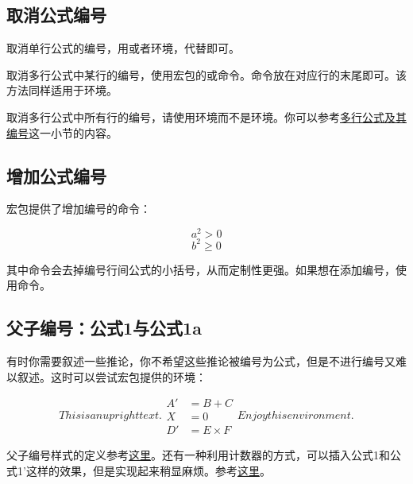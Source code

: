 \subsection{取消公式编号}
取消单行公式的编号，用\latexline{[\char`\\]}或者环境，代替即可。

取消多行公式中某行的编号，使用宏包的或命令。命令放在对应行的末尾即可。该方法同样适用于环境。

取消多行公式中所有行的编号，请使用环境而不是环境。你可以参考\hyperref[subsec:multieqnum]{多行公式及其编号}这一小节的内容。

\subsection{增加公式编号}
宏包提供了增加编号的命令：

\begin{codeshow}
\[a^2>0 \tag{$\star$}\]
\begin{equation}
b^2 \geqslant 0
\tag*{[Axiom]}
\end{equation}
\end{codeshow}

其中命令会去掉编号行间公式的小括号，从而定制性更强。如果想在添加编号，使用命令。

\subsection{父子编号：公式1与公式1a}
有时你需要叙述一些推论，你不希望这些推论被编号为公式，但是不进行编号又难以叙述。这时可以尝试宏包提供的环境：

\begin{codeshow}
\begin{subequations}
This is an upright text.
\begin{align}
A' &=B+C \\
X &=0 \nonumber \\
D' &=E \times F
\end{align}
Enjoy this environment.
\end{subequations}
\end{codeshow}

父子编号样式的定义参考\hyperref[code:parenteqnum]{这里}。还有一种利用计数器的方式，可以插入公式1和公式1'这样的效果，但是实现起来稍显麻烦。参考\hyperref[code:eq1plus]{这里}。

